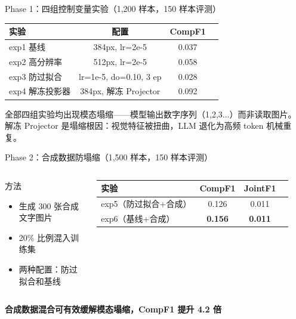 \documentclass[10pt,aspectratio=169,table]{beamer}
\begin{document}
\begin{frame}{Phase 1：四组控制变量实验（1,200 样本，150 样本评测）}
  \begin{table}
    \centering
    \scriptsize
    \begin{tabular}{lccc}
      \toprule
      \textbf{实验} & \textbf{配置} & \textbf{CompF1} \\
      \midrule
      exp1 基线 & 384px, lr=2e-5 & 0.037 \\
      exp2 高分辨率 & 512px, lr=2e-5 & 0.058 \\
      exp3 防过拟合 & lr=1e-5, do=0.10, 3 ep & 0.028 \\
      exp4 解冻投影器 & 384px, 解冻 Projector & 0.092 \\
      \bottomrule
    \end{tabular}
  \end{table}
  \begin{block}{}
    \footnotesize
    全部四组实验均出现模态塌缩——模型输出数字序列（1,2,3...）而非读取图片。
    解冻 Projector 是塌缩根因：视觉特征被扭曲，LLM 退化为高频 token 机械重复。
  \end{block}
\end{frame}

\begin{frame}{Phase 2：合成数据防塌缩（1,500 样本，150 样本评测）}
  \begin{columns}[T]
      \begin{block}{方法}
        \footnotesize
        \begin{itemize}
          \item 生成 300 张合成文字图片
          \item 20\% 比例混入训练集
          \item 两种配置：防过拟合和基线
        \end{itemize}
      \end{block}
      \begin{table}
        \centering
        \scriptsize
        \begin{tabular}{lccc}
          \toprule
          \textbf{实验} & \textbf{CompF1} & \textbf{JointF1} \\
          \midrule
          exp5（防过拟合+合成）& 0.126 & 0.011 \\
          exp6（基线+合成）& \textbf{0.156} & \textbf{0.011} \\
          \bottomrule
        \end{tabular}
      \end{table}
  \end{columns}
  \vspace{0.3cm}
  \begin{center}
    \footnotesize \textbf{合成数据混合可有效缓解模态塌缩，CompF1 提升 4.2 倍}
  \end{center}
\end{frame}
\end{document}
